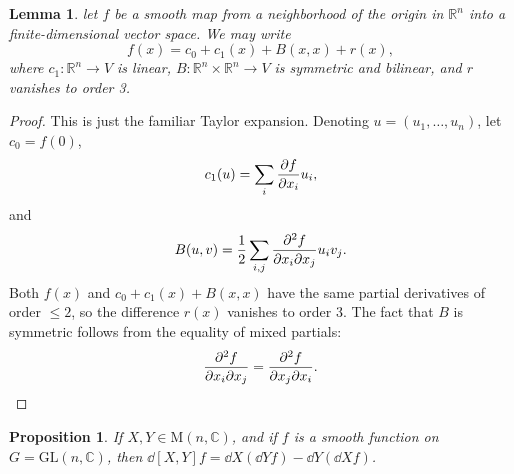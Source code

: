 \documentclass[12pt,reqno]{book}%
\newtheorem{lemma}{Lemma}[chapter]
\newtheorem{proposition}{Proposition}[chapter]
\theoremstyle{definition}
\theoremstyle{remark}
\theoremstyle{theorem}
\theoremstyle{remark}
\renewcommand{\d}{\dd}
\begin{document}
\begin{lemma}\label{lem7.1}%
    let $f$ be a smooth map from a neighborhood of the origin in $\mathbb{R}^{n}$ into a finite-dimensional vector space.
    We may write
    \begin{equation}\label{eq7.2}
        f(x) = c_0 + c_1(x) + B(x, x) + r(x),
    \end{equation}
    where $c_1 : \mathbb{R}^{n} \to V$ is linear, $B : \mathbb{R}^{n} \times \mathbb{R}^{n} \to V$ is symmetric and bilinear, and $r$ vanishes to order 3.
\end{lemma}%
\begin{proof}%
    This is just the familiar Taylor expansion.
    Denoting $u = (u_1, \ldots, u_n)$, let $c_0 = f(0)$,
    \[
        c_1(u) = \sum_{i} \pdv{f}{x_i}(0)u_i,
    \]
    and
    \[
        B(u, v) = \frac{1}{2} \sum_{i, j} \pdv[2]{f}{x_i}{x_j}(0)u_iv_j.
    \]
    Both $f(x)$ and $c_0 + c_1(x) + B(x, x)$ have the same partial derivatives of order $\leq 2$, so the difference $r(x)$ vanishes to order 3.
    The fact that $B$ is symmetric follows from the equality of mixed partials:
    \[
        \pdv[2]{f}{x_i}{x_j}(0) = \pdv[2]{f}{x_j}{x_i}(0).
    \]
\end{proof}%

\begin{proposition}\label{prop7.2}%
    If $X, Y \in \mathrm{M}(n, \mathbb{C})$, and if $f$ is a smooth function on $G = \mathrm{GL}(n, \mathbb{C})$, then $\d{[X, Y]}f = \d X(\d{Y}f) - \d Y(\d{X}f)$.
\end{proposition}%
\end{document}
